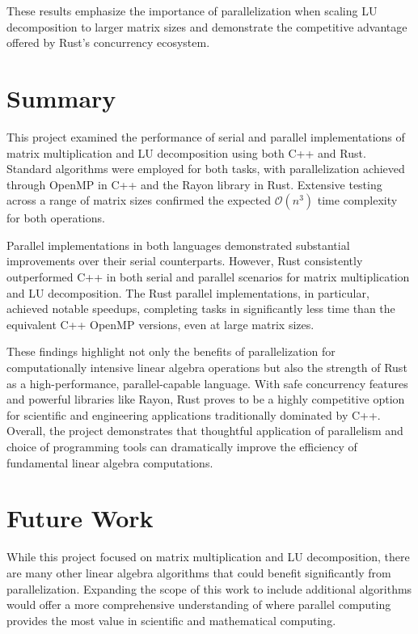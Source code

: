 \documentclass[12pt]{article}
\begin{document}
These results emphasize the importance of parallelization when scaling LU decomposition to larger matrix sizes and demonstrate the competitive advantage offered
by Rust's concurrency ecosystem.

\section{Summary}

This project examined the performance of serial and parallel implementations of matrix multiplication and LU decomposition using both C++ and Rust.
Standard algorithms were employed for both tasks, with parallelization achieved through OpenMP in C++ and the Rayon library in Rust. Extensive testing
across a range of matrix sizes confirmed the expected \( \mathcal{O}(n^3) \) time complexity for both operations.

Parallel implementations in both languages demonstrated substantial improvements over their serial counterparts. However, Rust consistently outperformed
C++ in both serial and parallel scenarios for matrix multiplication and LU decomposition. The Rust parallel implementations, in particular, achieved notable
speedups, completing tasks in significantly less time than the equivalent C++ OpenMP versions, even at large matrix sizes.

These findings highlight not only the benefits of parallelization for computationally intensive linear algebra operations but also the strength of Rust as
a high-performance, parallel-capable language. With safe concurrency features and powerful libraries like Rayon, Rust proves to be a highly competitive option
for scientific and engineering applications traditionally dominated by C++. Overall, the project demonstrates that thoughtful application of parallelism and
choice of programming tools can dramatically improve the efficiency of fundamental linear algebra computations.


\section{Future Work}
While this project focused on matrix multiplication and LU decomposition, there are many other linear algebra algorithms that could benefit significantly
from parallelization. Expanding the scope of this work to include additional algorithms would offer a more comprehensive understanding of where parallel
computing provides the most value in scientific and mathematical computing.
\end{document}
